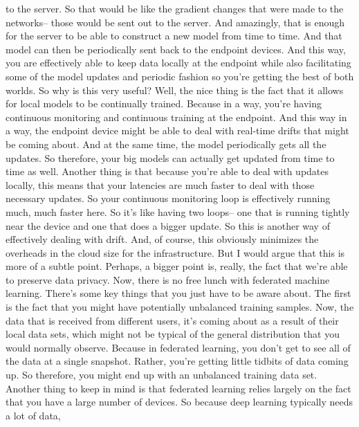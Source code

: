 {{{{{{{{{    to the server.
    So that would be like the gradient changes
    that were made to the networks-- those would be sent out to the server.
    And amazingly, that is enough for the server
    to be able to construct a new model from time to time.
    And that model can then be periodically sent back to the endpoint devices.
    And this way, you are effectively able to keep data locally at the endpoint
    while also facilitating some of the model updates and periodic fashion
    so you're getting the best of both worlds.
    So why is this very useful?
    Well, the nice thing is the fact that it allows for local models
    to be continually trained.
    Because in a way, you're having continuous monitoring
    and continuous training at the endpoint.
    And this way in a way, the endpoint device
    might be able to deal with real-time drifts that might be coming about.
    And at the same time, the model periodically gets all the updates.
    So therefore, your big models can actually
    get updated from time to time as well.
    Another thing is that because you're able to deal with updates locally,
    this means that your latencies are much faster
    to deal with those necessary updates.
    So your continuous monitoring loop is effectively
    running much, much faster here.
    So it's like having two loops-- one that is
    running tightly near the device and one that does a bigger update.
    So this is another way of effectively dealing with drift.
    And, of course, this obviously minimizes the overheads
    in the cloud size for the infrastructure.
    But I would argue that this is more of a subtle point.
    Perhaps, a bigger point is, really, the fact that we're
    able to preserve data privacy.
    Now, there is no free lunch with federated machine learning.
    There's some key things that you just have to be aware about.
    The first is the fact that you might have potentially unbalanced training
    samples.
    Now, the data that is received from different users,
    it's coming about as a result of their local data sets,
    which might not be typical of the general distribution
    that you would normally observe.
    Because in federated learning, you don't get to see all of the data
    at a single snapshot.
    Rather, you're getting little tidbits of data coming up.
    So therefore, you might end up with an unbalanced training data set.
    Another thing to keep in mind is that federated learning relies largely
    on the fact that you have a large number of devices.
    So because deep learning typically needs a lot of data,
}}}}}}}}}
